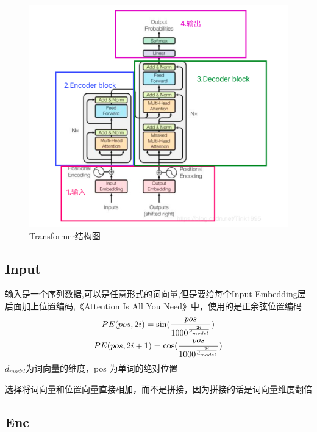 \documentclass{article}
\begin{document}
\begin{sloppypar}
      \begin{figure}[ht]
            \centering
            \includegraphics[scale=0.75]{transformer}
            \caption{Transformer结构图}
            \label{Transformer}
      \end{figure}

      \subsection{Input}
      输入是一个序列数据,可以是任意形式的词向量,但是要给每个Input Embedding层后面加上位置编码,《Attention Is All You Need》中，使用的是正余弦位置编码
      \begin{gather}
            PE(pos,2i)=\sin (\frac{pos}{1000^{\frac{2i}{d_{model}}}})\\
            \newline
            PE(pos,2i+1)=\cos (\frac{pos}{1000^{\frac{2i}{d_{model}}}})
      \end{gather}
      $d_{model}$为词向量的维度，pos 为单词的绝对位置

      选择将词向量和位置向量直接相加，而不是拼接，因为拼接的话是词向量维度翻倍


      \subsection{Enc}
      \newpage


\end{sloppypar}
\end{document}
